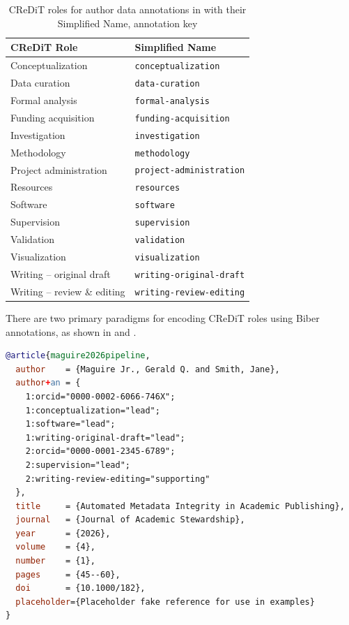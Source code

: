 \documentclass[12pt, twoside]{article}
\begin{document}
\begin{table}[!htp]
  \centering
  \caption{CReDiT roles for author data annotations in \BibLaTeX with their Simplified Name, \ie annotation key }
  \label{tab:CReDiT_annotation}
  \begin{tabular}{L{5.5cm} L{8.5cm}}
    \hline
    \textbf{CReDiT Role} & \textbf{Simplified Name} \\
    \hline
    Conceptualization          & \texttt{conceptualization} \\
    Data curation              & \texttt{data-curation} \\
    Formal analysis            & \texttt{formal-analysis}\\
    Funding acquisition        & \texttt{funding-acquisition} \\
    Investigation              & \texttt{investigation}\\
    Methodology                & \texttt{methodology} \\
    Project administration     & \texttt{project-administration} \\
    Resources                  & \texttt{resources} \\
    Software                   & \texttt{software} \\
    Supervision                & \texttt{supervision} \\
    Validation                 & \texttt{validation} \\
    Visualization              & \texttt{visualization} \\
    Writing -- original draft  & \texttt{writing-original-draft} \\
    Writing -- review \& editing & \texttt{writing-review-editing}\\
    \hline
  \end{tabular}
\end{table}
\FloatBarrier

There are two primary paradigms for encoding \gls{CReDiT} roles using Biber annotations, as shown in  and .

\begin{lstlisting}[language={BibTeX}, breaklines=true, basicstyle=\small\ttfamily, caption={{Pattern A: Role-as-Key (Fine-grained with degrees of contribution)}}, label=lst:biberCreditPatternA]
@article{maguire2026pipeline,
  author    = {Maguire Jr., Gerald Q. and Smith, Jane},
  author+an = {
    1:orcid="0000-0002-6066-746X";
    1:conceptualization="lead";
    1:software="lead";
    1:writing-original-draft="lead";
    2:orcid="0000-0001-2345-6789";
    2:supervision="lead";
    2:writing-review-editing="supporting"
  },
  title     = {Automated Metadata Integrity in Academic Publishing},
  journal   = {Journal of Academic Stewardship},
  year      = {2026},
  volume    = {4},
  number    = {1},
  pages     = {45--60},
  doi       = {10.1000/182},
  placeholder={Placeholder fake reference for use in examples}
}
\end{lstlisting}
\end{document}
